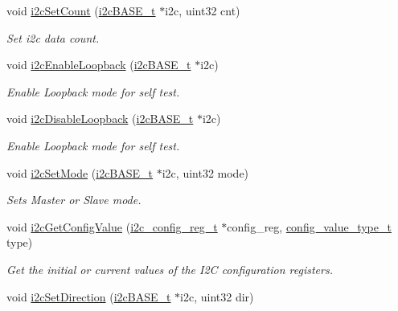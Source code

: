 \begin{DoxyCompactItemize}
void \mbox{\hyperlink{group__I2C_ga66620637f03669285b546eada30bd6c2}{i2c\+Set\+Count}} (\mbox{\hyperlink{reg__i2c_8h_a5d6c119fb20e803a530d0d4df544daf7}{i2c\+B\+A\+S\+E\+\_\+t}} $\ast$i2c, uint32 cnt)
\begin{DoxyCompactList}\small\item\em Set i2c data count. \end{DoxyCompactList}\item 
void \mbox{\hyperlink{group__I2C_gac844de7b323a732e81c2647231a35e6b}{i2c\+Enable\+Loopback}} (\mbox{\hyperlink{reg__i2c_8h_a5d6c119fb20e803a530d0d4df544daf7}{i2c\+B\+A\+S\+E\+\_\+t}} $\ast$i2c)
\begin{DoxyCompactList}\small\item\em Enable Loopback mode for self test. \end{DoxyCompactList}\item 
void \mbox{\hyperlink{group__I2C_ga2c7b51e17f17e8cff5db50b18cf31bfa}{i2c\+Disable\+Loopback}} (\mbox{\hyperlink{reg__i2c_8h_a5d6c119fb20e803a530d0d4df544daf7}{i2c\+B\+A\+S\+E\+\_\+t}} $\ast$i2c)
\begin{DoxyCompactList}\small\item\em Enable Loopback mode for self test. \end{DoxyCompactList}\item 
void \mbox{\hyperlink{group__I2C_gab52915ececd5be5a2956a2f93255981e}{i2c\+Set\+Mode}} (\mbox{\hyperlink{reg__i2c_8h_a5d6c119fb20e803a530d0d4df544daf7}{i2c\+B\+A\+S\+E\+\_\+t}} $\ast$i2c, uint32 mode)
\begin{DoxyCompactList}\small\item\em Sets Master or Slave mode. \end{DoxyCompactList}\item 
void \mbox{\hyperlink{group__I2C_ga12181f4e0410fe3d21de4995eee72ec9}{i2c\+Get\+Config\+Value}} (\mbox{\hyperlink{structi2c__config__reg}{i2c\+\_\+config\+\_\+reg\+\_\+t}} $\ast$config\+\_\+reg, \mbox{\hyperlink{sys__common_8h_a9daf9a5992391b058477d28d107ee5e2}{config\+\_\+value\+\_\+type\+\_\+t}} type)
\begin{DoxyCompactList}\small\item\em Get the initial or current values of the I2C configuration registers. \end{DoxyCompactList}\item 
void \mbox{\hyperlink{group__I2C_ga0c1c6c373aa51b8a93cb18f901f9e955}{i2c\+Set\+Direction}} (\mbox{\hyperlink{reg__i2c_8h_a5d6c119fb20e803a530d0d4df544daf7}{i2c\+B\+A\+S\+E\+\_\+t}} $\ast$i2c, uint32 dir)

\end{DoxyCompactItemize}
